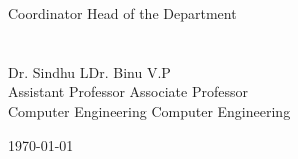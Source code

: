 \documentclass[11pt]{report}
\begin{document}
\begin{titlepage}
\begin{tabbing}
Coordinator\>\> Head of the Department
\\
\\
\\
Dr. Sindhu L\>\>Dr. Binu V.P\\
Assistant Professor	\>\> Associate Professor\\
Computer Engineering	\>\>	Computer Engineering
\end{tabbing}
 \vspace{.1in}

\begin{flushleft}
\today
\end{flushleft}
\end{titlepage}
\end{document}
